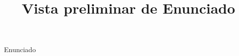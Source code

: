 \documentclass[a4paper,10pt]{article}\usepackage[utf8]{inputenc}\usepackage[spanish]{babel}\usepackage{times}
\title{Vista preliminar de Enunciado}
\begin{document}
\twocolumn 

\maketitle

Enunciado
\end{document}
